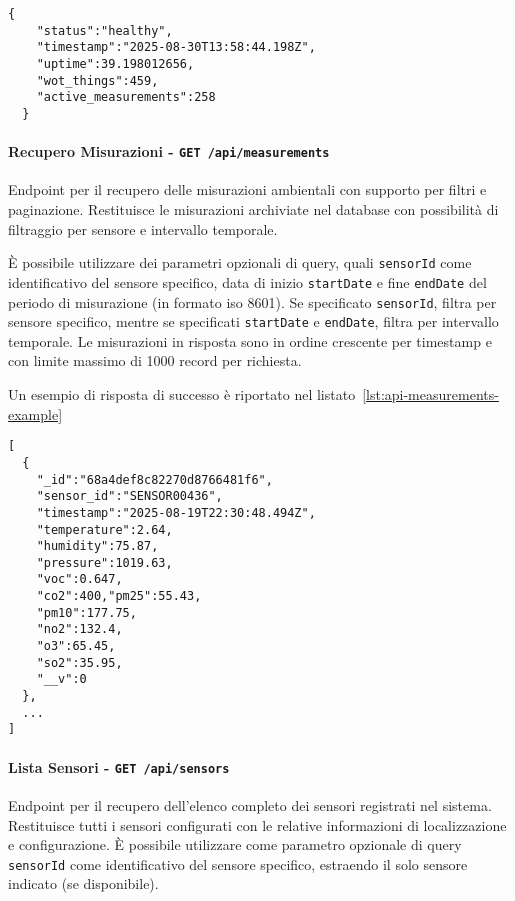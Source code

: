 \begin{lstlisting}[caption={Risposta di sucesso per endpoint \texttt{health}}, label=lst:api-health-example]
  {
    "status":"healthy",
    "timestamp":"2025-08-30T13:58:44.198Z",
    "uptime":39.198012656,
    "wot_things":459,
    "active_measurements":258
  }
\end{lstlisting}

\paragraph{Recupero Misurazioni - \texttt{GET /api/measurements}}

Endpoint per il recupero delle misurazioni ambientali con supporto per filtri e paginazione.
Restituisce le misurazioni archiviate nel database con possibilità di filtraggio per sensore e intervallo temporale.

È possibile utilizzare dei parametri opzionali di query, quali
\texttt{sensorId} come identificativo del sensore specifico,
data di inizio \texttt{startDate} e fine \texttt{endDate} del periodo di misurazione (in formato \acrshort{iso} 8601).
Se specificato \texttt{sensorId}, filtra per sensore specifico,
mentre se specificati \texttt{startDate} e \texttt{endDate}, filtra per intervallo temporale.
Le misurazioni in risposta sono in ordine crescente per timestamp e con limite massimo di 1000 record per richiesta.

Un esempio di risposta di successo è riportato nel listato~\ref{lst:api-measurements-example}
\begin{lstlisting}[caption={Risposta di sucesso per endpoint \texttt{measurements}},label=lst:api-measurements-example]
[
  {
    "_id":"68a4def8c82270d8766481f6",
    "sensor_id":"SENSOR00436",
    "timestamp":"2025-08-19T22:30:48.494Z",
    "temperature":2.64,
    "humidity":75.87,
    "pressure":1019.63,
    "voc":0.647,
    "co2":400,"pm25":55.43,
    "pm10":177.75,
    "no2":132.4,
    "o3":65.45,
    "so2":35.95,
    "__v":0
  },
  ...
]
\end{lstlisting}

\paragraph{Lista Sensori - \texttt{GET /api/sensors}}

Endpoint per il recupero dell'elenco completo dei sensori registrati nel sistema.
Restituisce tutti i sensori configurati con le relative informazioni di localizzazione e configurazione.
È possibile utilizzare come parametro opzionale di query \texttt{sensorId} come identificativo del sensore specifico,
estraendo il solo sensore indicato (se disponibile).

